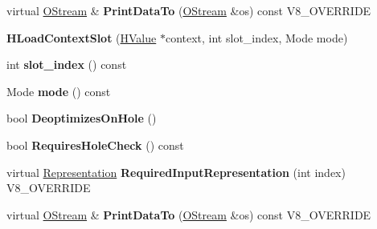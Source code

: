 \begin{DoxyCompactItemize}
\item 
\hypertarget{classv8_1_1internal_1_1_v8___f_i_n_a_l_ac450dad970b14246be761ccf5004924b}{}virtual \hyperlink{classv8_1_1internal_1_1_o_stream}{O\+Stream} \& {\bfseries Print\+Data\+To} (\hyperlink{classv8_1_1internal_1_1_o_stream}{O\+Stream} \&os) const V8\+\_\+\+O\+V\+E\+R\+R\+I\+D\+E\label{classv8_1_1internal_1_1_v8___f_i_n_a_l_ac450dad970b14246be761ccf5004924b}

\item 
\hypertarget{classv8_1_1internal_1_1_v8___f_i_n_a_l_ad0112907b27289e9cc49222bdf2467f6}{}{\bfseries H\+Load\+Context\+Slot} (\hyperlink{classv8_1_1internal_1_1_h_value}{H\+Value} $\ast$context, int slot\+\_\+index, Mode mode)\label{classv8_1_1internal_1_1_v8___f_i_n_a_l_ad0112907b27289e9cc49222bdf2467f6}

\item 
\hypertarget{classv8_1_1internal_1_1_v8___f_i_n_a_l_a545652ddd25053d6fc283843adf4e334}{}int {\bfseries slot\+\_\+index} () const \label{classv8_1_1internal_1_1_v8___f_i_n_a_l_a545652ddd25053d6fc283843adf4e334}

\item 
\hypertarget{classv8_1_1internal_1_1_v8___f_i_n_a_l_a97524cd64c544d93e042006784ced198}{}Mode {\bfseries mode} () const \label{classv8_1_1internal_1_1_v8___f_i_n_a_l_a97524cd64c544d93e042006784ced198}

\item 
\hypertarget{classv8_1_1internal_1_1_v8___f_i_n_a_l_ae97815c39f21b10c96e3d9654f6c689c}{}bool {\bfseries Deoptimizes\+On\+Hole} ()\label{classv8_1_1internal_1_1_v8___f_i_n_a_l_ae97815c39f21b10c96e3d9654f6c689c}

\item 
\hypertarget{classv8_1_1internal_1_1_v8___f_i_n_a_l_a4baa3a2da8e6a98dcd29e67a269e36e3}{}bool {\bfseries Requires\+Hole\+Check} () const \label{classv8_1_1internal_1_1_v8___f_i_n_a_l_a4baa3a2da8e6a98dcd29e67a269e36e3}

\item 
\hypertarget{classv8_1_1internal_1_1_v8___f_i_n_a_l_a6c6d1f37f40b113d8f4062f1ffff7215}{}virtual \hyperlink{classv8_1_1internal_1_1_representation}{Representation} {\bfseries Required\+Input\+Representation} (int index) V8\+\_\+\+O\+V\+E\+R\+R\+I\+D\+E\label{classv8_1_1internal_1_1_v8___f_i_n_a_l_a6c6d1f37f40b113d8f4062f1ffff7215}

\item 
\hypertarget{classv8_1_1internal_1_1_v8___f_i_n_a_l_ac450dad970b14246be761ccf5004924b}{}virtual \hyperlink{classv8_1_1internal_1_1_o_stream}{O\+Stream} \& {\bfseries Print\+Data\+To} (\hyperlink{classv8_1_1internal_1_1_o_stream}{O\+Stream} \&os) const V8\+\_\+\+O\+V\+E\+R\+R\+I\+D\+E\label{classv8_1_1internal_1_1_v8___f_i_n_a_l_ac450dad970b14246be761ccf5004924b}


\end{DoxyCompactItemize}
